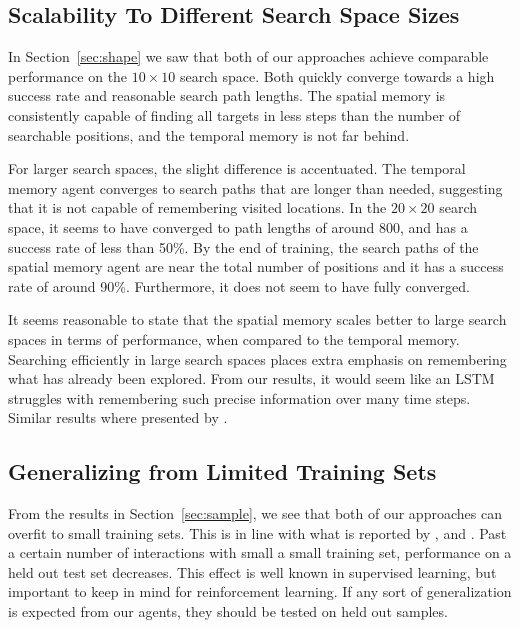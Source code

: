 \subsection{Scalability To Different Search Space Sizes}

In Section~\ref{sec:shape} we saw that both of our approaches achieve comparable performance on the \(10 \times 10\) search space.
Both quickly converge towards a high success rate and reasonable search path lengths.
The spatial memory is consistently capable of finding all targets in less steps than the number of searchable positions, and the temporal memory is not far behind.

For larger search spaces, the slight difference is accentuated.
The temporal memory agent converges to search paths that are longer than needed, suggesting that it is not capable of remembering visited locations.
In the \(20 \times 20\) search space, it seems to have converged to path lengths of around 800, and has a success rate of less than 50\%.
By the end of training, the search paths of the spatial memory agent are near the total number of positions and it has a success rate of around 90\%.
Furthermore, it does not seem to have fully converged.

It seems reasonable to state that the spatial memory scales better to large search spaces in terms of performance, when compared to the temporal memory.
Searching efficiently in large search spaces places extra emphasis on remembering what has already been explored.
From our results, it would seem like an LSTM struggles with remembering such precise information over many time steps.
Similar results where presented by \cite{oh_minecraft_2016}.

\subsection{Generalizing from Limited Training Sets}

From the results in Section~\ref{sec:sample}, we see that both of our approaches can overfit to small training sets.
This is in line with what is reported by \cite{cobbe_procgen_2020}, \cite{cobbe_generalization_2019} and \cite{zhang_overfitting_2018}.
Past a certain number of interactions with small a small training set, performance on a held out test set decreases.
This effect is well known in supervised learning, but important to keep in mind for reinforcement learning.
If any sort of generalization is expected from our agents, they should be tested on held out samples.

